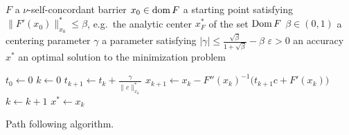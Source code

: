 \begin{algorithm}[ht]
  \begin{algorithmic}[1]
    \Require
      \Statex $F$ a $\nu$-self-concordant barrier
      \Statex $x_0 \in \operatorname{dom} F$ a starting point satisfying $\|F'(x_0)\|^*_{x_0} \leq \beta$, e.g.\ the analytic center $x^*_F$ of the set $\operatorname{Dom} F$
      \Statex $\beta \in (0,1)$ a centering parameter
      \Statex $\gamma$ a parameter satisfying $|\gamma| \leq \frac{\sqrt{\beta}}{1+\sqrt{\beta}} - \beta$
      \Statex $\varepsilon > 0$ an accuracy
    \Ensure
      \Statex $x^*$ an optimal solution to the minimization problem 
      \Statex

    \State $t_0 \gets 0$
    \State $k \gets 0$
      \State $t_{k+1} \gets t_k + \frac{\gamma}{\|c\|^*_{x_k}}$
      \State $x_{k+1} \gets x_k - F''(x_k)^{-1}\big(t_{k+1}c + F'(x_k)\big)$
      \State $k \gets k + 1$
    \EndWhile
    \State \Return $x^* \gets x_k$

  \end{algorithmic}
  \caption{Path following algorithm. \cite[Scheme~4.2.23]{Nesterov-2004}}
\end{algorithm}
